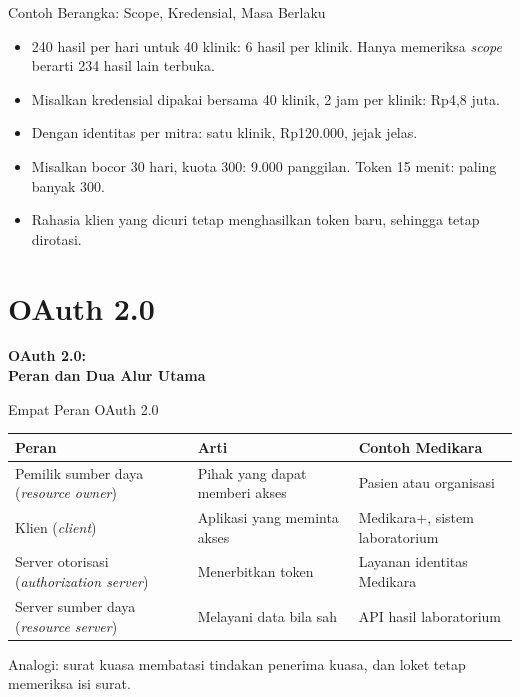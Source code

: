 \documentclass[aspectratio=169, table, 12pt]{beamer}
\begin{document}
\begin{frame}{{\Large Contoh Berangka: Scope, Kredensial, Masa Berlaku}}
  \vspace{6pt}
  \begin{itemize}
    \item 240 hasil per hari untuk 40 klinik: 6 hasil per klinik. Hanya memeriksa \textit{scope} berarti 234 hasil lain terbuka.
    \item Misalkan kredensial dipakai bersama 40 klinik, 2 jam per klinik: Rp4,8 juta.
    \item Dengan identitas per mitra: satu klinik, Rp120.000, jejak jelas.
    \item Misalkan bocor 30 hari, kuota 300: 9.000 panggilan. Token 15 menit: paling banyak 300.
    \item Rahasia klien yang dicuri tetap menghasilkan token baru, sehingga tetap dirotasi.
  \end{itemize}
\end{frame}

\section{OAuth 2.0}

\begin{frame}{\hfill}
  \centering
  \Huge{\textbf{OAuth 2.0:\\Peran dan Dua Alur Utama}}
\end{frame}

\begin{frame}{{\Large Empat Peran OAuth 2.0}}
  \small
  \begin{tabularx}{\textwidth}{>{\raggedright\arraybackslash}p{4.2cm}
      >{\raggedright\arraybackslash}X >{\raggedright\arraybackslash}p{3.4cm}}
    \hline
    \textbf{Peran} & \textbf{Arti} & \textbf{Contoh Medikara} \\ \hline
    Pemilik sumber daya (\textit{resource owner}) & Pihak yang dapat memberi akses & Pasien atau organisasi \\ \hline
    Klien (\textit{client}) & Aplikasi yang meminta akses & Medikara+, sistem laboratorium \\ \hline
    Server otorisasi (\textit{authorization server}) & Menerbitkan token & Layanan identitas Medikara \\ \hline
    Server sumber daya (\textit{resource server}) & Melayani data bila sah & API hasil laboratorium \\ \hline
  \end{tabularx}

  \vspace{8pt}
  Analogi: surat kuasa membatasi tindakan penerima kuasa, dan loket tetap memeriksa isi surat.
\end{frame}
\end{document}
